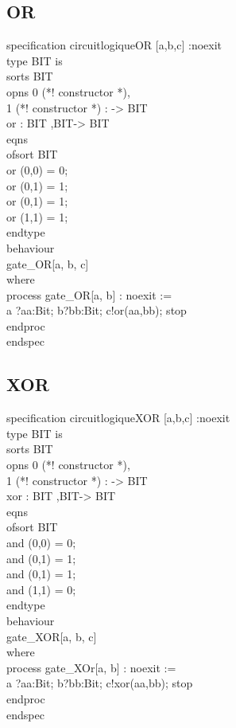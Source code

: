 \documentclass{article}
\begin{document}
    \subsection*{OR}
    specification circuitlogiqueOR [a,b,c] :noexit \\
    type BIT is \\
        sorts BIT\\
        opns 0 (*! constructor *), \\
            1 (*! constructor *) : -> BIT\\
        or : BIT ,BIT-> BIT\\
        eqns \\
            ofsort BIT \\
            or (0,0) = 0; \\
            or (0,1) = 1; \\
            or (0,1) = 1; \\
            or (1,1) = 1; \\
    endtype\\ 
    behaviour\\ 
        gate_OR[a, b, c]\\
    where \\
        process gate_OR[a, b] : noexit :=\\ 
        a ?aa:Bit; b?bb:Bit;  c!or(aa,bb); stop \\
        endproc \\
    endspec\\
    \subsection*{XOR}
    specification circuitlogiqueXOR [a,b,c] :noexit \\
    type BIT is \\
        sorts BIT\\
        opns 0 (*! constructor *), \\
            1 (*! constructor *) : -> BIT\\
        xor : BIT ,BIT-> BIT\\
        eqns \\
            ofsort BIT \\
            and (0,0) = 0; \\
            and (0,1) = 1; \\
            and (0,1) = 1; \\
            and (1,1) = 0; \\
    endtype\\ 
    behaviour\\ 
        gate_XOR[a, b, c]\\
    where \\
        process gate_XOr[a, b] : noexit :=\\ 
        a ?aa:Bit; b?bb:Bit;  c!xor(aa,bb); stop \\
        endproc \\
    endspec\\
\end{document}
